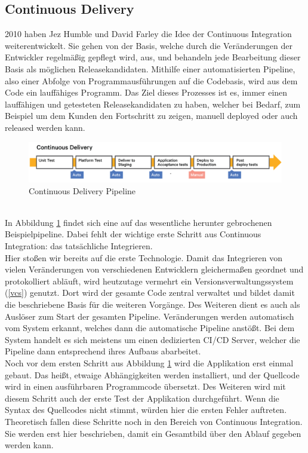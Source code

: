 \subsection{Continuous Delivery}
2010 haben Jez Humble und David Farley\autocite{Farley.2010} die Idee der Continuous Integration weiterentwickelt. Sie gehen von der Basis, welche durch die Veränderungen der Entwickler regelmäßig gepflegt wird, aus, und behandeln jede Bearbeitung dieser Basis als möglichen Releasekandidaten.\autocite[Vgl.][S.5]{Stahl.2018} Mithilfe einer automatisierten Pipeline, also einer Abfolge von Programmausführungen auf die Codebasis, wird aus dem Code ein lauffähiges Programm. Das Ziel dieses Prozesses ist es, immer einen lauffähigen und getesteten Releasekandidaten zu haben, welcher bei Bedarf, zum Beispiel um dem Kunden den Fortschritt zu zeigen, manuell deployed oder auch released werden kann.\autocite[Vgl.][S.16]{Stahl.2018}
\begin{figure}[h!]
	\centering
	\includegraphics[scale = 0.3]{img/CDE.png}
	\caption{Continuous Delivery Pipeline}
	\label{img:cde}
\end{figure}\\
In Abbildung \ref{img:cde} findet sich eine auf das wesentliche herunter gebrochenen Beispielpipeline. Dabei fehlt der wichtige erste Schritt aus Continuous Integration: das tatsächliche Integrieren.\\ Hier stoßen wir bereits auf die erste Technologie. Damit das Integrieren von vielen Veränderungen von verschiedenen Entwicklern gleichermaßen geordnet und protokolliert abläuft, wird heutzutage vermehrt ein Versionsverwaltungssystem (\ref{vcs}) genutzt.\autocite[Vgl.][S.2]{Arachchi.2018} Dort wird der gesamte Code zentral verwaltet und bildet damit die beschriebene Basis für die weiteren Vorgänge. Des Weiteren dient es auch als Auslöser zum Start der gesamten Pipeline. Veränderungen werden automatisch vom System erkannt, welches dann die automatische Pipeline anstößt. Bei dem System handelt es sich meistens um einen dedizierten CI/CD Server, welcher die Pipeline dann entsprechend ihres Aufbaus abarbeitet.\autocite[Vgl.][S.2]{Meyer.2014}\\ Noch vor dem ersten Schritt aus Abbildung \ref{img:cde} wird die Applikation erst einmal gebaut. Das heißt, etwaige Abhängigkeiten werden installiert, und der Quellcode wird in einen ausführbaren Programmcode übersetzt.\autocite[Vgl.][S.36]{Farley.2010} Des Weiteren wird mit diesem Schritt auch der erste Test der Applikation durchgeführt. Wenn die Syntax des Quellcodes nicht stimmt, würden hier die ersten Fehler auftreten.\autocite[Vgl.][S.37]{Farley.2010}\\ Theoretisch fallen diese Schritte noch in den Bereich von Continuous Integration. Sie werden erst hier beschrieben, damit ein Gesamtbild über den Ablauf gegeben werden kann.\\

